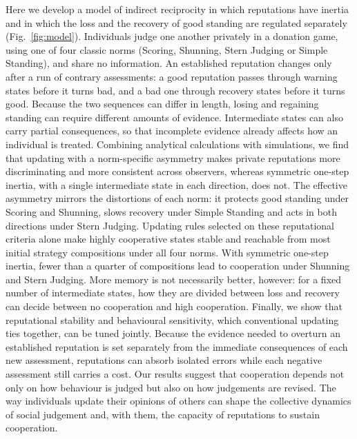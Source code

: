 Here we develop a model of indirect reciprocity in which reputations have inertia and in which the loss and the recovery of good standing are regulated separately (Fig.~\ref{fig:model}). Individuals judge one another privately in a donation game, using one of four classic norms (Scoring, Shunning, Stern Judging or Simple Standing), and share no information. An established reputation changes only after a run of contrary assessments: a good reputation passes through warning states before it turns bad, and a bad one through recovery states before it turns good. Because the two sequences can differ in length, losing and regaining standing can require different amounts of evidence. Intermediate states can also carry partial consequences, so that incomplete evidence already affects how an individual is treated. Combining analytical calculations with simulations, we find that updating with a norm-specific asymmetry makes private reputations more discriminating and more consistent across observers, whereas symmetric one-step inertia, with a single intermediate state in each direction, does not. The effective asymmetry mirrors the distortions of each norm: it protects good standing under Scoring and Shunning, slows recovery under Simple Standing and acts in both directions under Stern Judging. Updating rules selected on these reputational criteria alone make highly cooperative states stable and reachable from most initial strategy compositions under all four norms. With symmetric one-step inertia, fewer than a quarter of compositions lead to cooperation under Shunning and Stern Judging. More memory is not necessarily better, however: for a fixed number of intermediate states, how they are divided between loss and recovery can decide between no cooperation and high cooperation. Finally, we show that reputational stability and behavioural sensitivity, which conventional updating ties together, can be tuned jointly. Because the evidence needed to overturn an established reputation is set separately from the immediate consequences of each new assessment, reputations can absorb isolated errors while each negative assessment still carries a cost. Our results suggest that cooperation depends not only on how behaviour is judged but also on how judgements are revised. The way individuals update their opinions of others can shape the collective dynamics of social judgement and, with them, the capacity of reputations to sustain cooperation.
